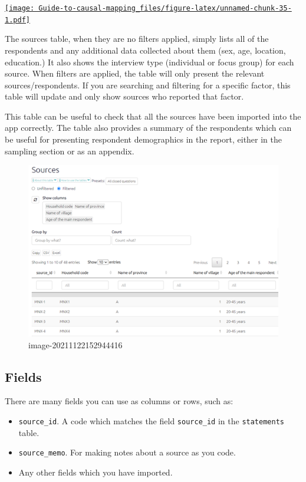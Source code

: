 \documentclass[
]{book}
\providecommand{\tightlist}{%
  \setlength{\itemsep}{0pt}\setlength{\parskip}{0pt}}
\begin{document}
\href{https://player.vimeo.com/video/596519456}{\texttt{[image: Guide-to-causal-mapping\_files/figure-latex/unnamed-chunk-35-1.pdf]}}

The sources table, when they are no filters applied, simply lists all of the respondents and any additional data collected about them (sex, age, location, education.) It also shows the interview type (individual or focus group) for each source. When filters are applied, the table will only present the relevant sources/respondents. If you are searching and filtering for a specific factor, this table will update and only show sources who reported that factor.

This table can be useful to check that all the sources have been imported into the app correctly. The table also provides a summary of the respondents which can be useful for presenting respondent demographics in the report, either in the sampling section or as an appendix.

\begin{figure}
\centering
\includegraphics[width=6.77083in,height=\textheight]{_assets/image-20211122152944416.png}
\caption{image-20211122152944416}
\end{figure}

\hypertarget{fields-5}{%
\subsection{Fields}\label{fields-5}}

There are many fields you can use as columns or rows, such as:

\begin{itemize}
\tightlist
\item
  \texttt{source\_id}. A code which matches the field \texttt{source\_id} in the \texttt{statements} table.
\item
  \texttt{source\_memo}. For making notes about a source as you code.
\item
  Any other fields which you have imported.
\end{itemize}
\end{document}
